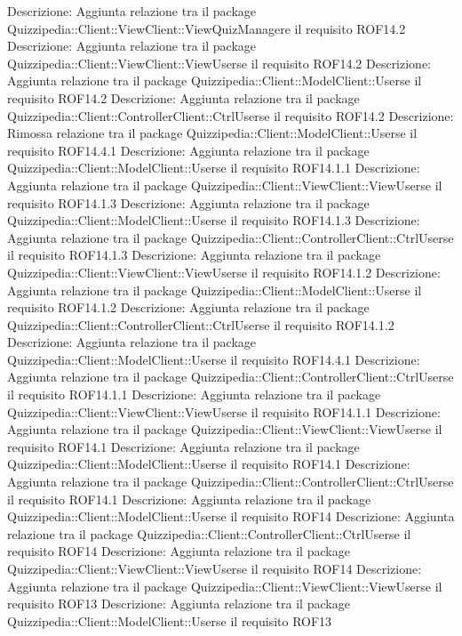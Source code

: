 Descrizione: Aggiunta relazione tra il package Quizzipedia::Client::ViewClient::ViewQuizManagere il requisito ROF14.2 
Descrizione: Aggiunta relazione tra il package Quizzipedia::Client::ViewClient::ViewUserse il requisito ROF14.2 
Descrizione: Aggiunta relazione tra il package Quizzipedia::Client::ModelClient::Userse il requisito ROF14.2 
Descrizione: Aggiunta relazione tra il package Quizzipedia::Client::ControllerClient::CtrlUserse il requisito ROF14.2 
Descrizione: Rimossa relazione tra il package Quizzipedia::Client::ModelClient::Userse il requisito ROF14.4.1 
Descrizione: Aggiunta relazione tra il package Quizzipedia::Client::ModelClient::Userse il requisito ROF14.1.1 
Descrizione: Aggiunta relazione tra il package Quizzipedia::Client::ViewClient::ViewUserse il requisito ROF14.1.3 
Descrizione: Aggiunta relazione tra il package Quizzipedia::Client::ModelClient::Userse il requisito ROF14.1.3 
Descrizione: Aggiunta relazione tra il package Quizzipedia::Client::ControllerClient::CtrlUserse il requisito ROF14.1.3 
Descrizione: Aggiunta relazione tra il package Quizzipedia::Client::ViewClient::ViewUserse il requisito ROF14.1.2 
Descrizione: Aggiunta relazione tra il package Quizzipedia::Client::ModelClient::Userse il requisito ROF14.1.2 
Descrizione: Aggiunta relazione tra il package Quizzipedia::Client::ControllerClient::CtrlUserse il requisito ROF14.1.2 
Descrizione: Aggiunta relazione tra il package Quizzipedia::Client::ModelClient::Userse il requisito ROF14.4.1 
Descrizione: Aggiunta relazione tra il package Quizzipedia::Client::ControllerClient::CtrlUserse il requisito ROF14.1.1 
Descrizione: Aggiunta relazione tra il package Quizzipedia::Client::ViewClient::ViewUserse il requisito ROF14.1.1 
Descrizione: Aggiunta relazione tra il package Quizzipedia::Client::ViewClient::ViewUserse il requisito ROF14.1 
Descrizione: Aggiunta relazione tra il package Quizzipedia::Client::ModelClient::Userse il requisito ROF14.1 
Descrizione: Aggiunta relazione tra il package Quizzipedia::Client::ControllerClient::CtrlUserse il requisito ROF14.1 
Descrizione: Aggiunta relazione tra il package Quizzipedia::Client::ModelClient::Userse il requisito ROF14 
Descrizione: Aggiunta relazione tra il package Quizzipedia::Client::ControllerClient::CtrlUserse il requisito ROF14 
Descrizione: Aggiunta relazione tra il package Quizzipedia::Client::ViewClient::ViewUserse il requisito ROF14 
Descrizione: Aggiunta relazione tra il package Quizzipedia::Client::ViewClient::ViewUserse il requisito ROF13 
Descrizione: Aggiunta relazione tra il package Quizzipedia::Client::ModelClient::Userse il requisito ROF13 
